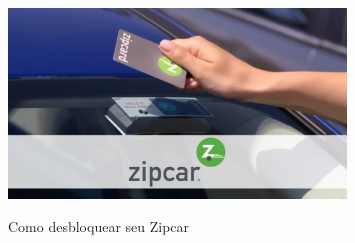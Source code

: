 \begin{figure}[!hbtp]
	\centering
	\caption{Como desbloquear seu Zipcar}
	\includegraphics[width=0.8\textwidth]{./04-figuras/zipcar/zipcar.jpg}
	\label{fig:zipcar}
\end{figure}



